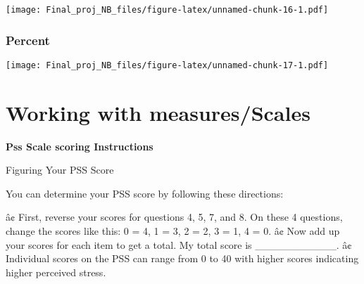\documentclass[]{article}
\newenvironment{Shaded}{\begin{snugshade}}{\end{snugshade}}
\newcommand{\KeywordTok}[1]{\textcolor[rgb]{0.13,0.29,0.53}{\textbf{#1}}}
\newcommand{\DataTypeTok}[1]{\textcolor[rgb]{0.13,0.29,0.53}{#1}}
\newcommand{\DecValTok}[1]{\textcolor[rgb]{0.00,0.00,0.81}{#1}}
\newcommand{\StringTok}[1]{\textcolor[rgb]{0.31,0.60,0.02}{#1}}
\newcommand{\OtherTok}[1]{\textcolor[rgb]{0.56,0.35,0.01}{#1}}
\newcommand{\ControlFlowTok}[1]{\textcolor[rgb]{0.13,0.29,0.53}{\textbf{#1}}}
\newcommand{\OperatorTok}[1]{\textcolor[rgb]{0.81,0.36,0.00}{\textbf{#1}}}
\newcommand{\NormalTok}[1]{#1}
\begin{document}
\texttt{[image: Final\_proj\_NB\_files/figure-latex/unnamed-chunk-16-1.pdf]}

\subsubsection{Percent}\label{percent-1}

\begin{Shaded}
\end{Shaded}

\texttt{[image: Final\_proj\_NB\_files/figure-latex/unnamed-chunk-17-1.pdf]}

\section{Working with
measures/Scales}\label{working-with-measuresscales}

\textbf{Pss Scale scoring Instructions}

Figuring Your PSS Score

You can determine your PSS score by following these directions:

â¢ First, reverse your scores for questions 4, 5, 7, and 8. On these 4
questions, change the scores like this: 0 = 4, 1 = 3, 2 = 2, 3 = 1, 4 =
0. â¢ Now add up your scores for each item to get a total. My total
score is \_\_\_\_\_\_\_\_\_\_\_. â¢ Individual scores on the PSS can
range from 0 to 40 with higher scores indicating higher perceived
stress.
\end{document}
